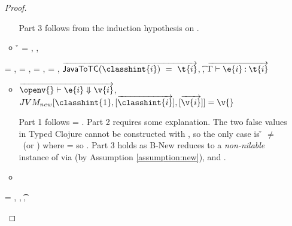 \begin{lemma}
\begin{enumerate}
\begin{proof}
\begin{case}[T-Do]
\begin{itemize}
\begin{subcase}[B-Do]
Part 3 follows from the induction hypothesis on .
    \end{subcase}
  \item[]
\begin{subcase}[BE-Do]
  \v{} = {},
\opsem {\openv{}} {} {},



\end{subcase}
\end{itemize}
\end{case}

\begin{case}[T-NewStatic]
  \e{} = { {\classhint{}} 
                                                          {\class{}} {}},
  \object{} = \emptyobject{},
\thenprop{\prop{}} = \topprop{},
\elseprop{\prop{}} = \botprop{},
   $\overrightarrow{
\javatotc {\classhint{i}}
          {\t{i}}
          }$,
  \javatotc {\classhint{}}
            {\t{}},
            $
  \overrightarrow{
  \judgementtwo {\propenv{}}
                    {\hastype {\e{i}} {\t{i}}}
                  }$

\begin{itemize}
  \item[]
\begin{subcase}[B-New]
  $
  \overrightarrow{
  \opsem {\openv{}}
         {\e{i}}
         {\v{i}}
       }$,
         $\newjava {\classhint{1}}
                  {\overrightarrow{\classhint{i}}}
                  {\overrightarrow{\v{i}}}
                  {\v{}}$

Part 1 follows \object{} = \emptyobject{}.
Part 2 requires some explanation. The two false values in Typed Clojure
cannot be constructed with \newliteral, so the only case is \v{} $\not=$ \false\ (or \nil)
where \thenprop{\prop{}} = \topprop{} so \satisfies{\openv{}}{\thenprop{\prop{}}}.
Part 3 holds as B-New reduces to a \emph{non-nilable}
instance of \class{} via \newjavaliteral (by Assumption \ref{assumption:new}), and \javatotc{\classhint{}}{\t{}}.
\end{subcase}
  \item[]
\begin{subcase}[BE-New]
\end{subcase}
\end{itemize}
\end{case}

\begin{case}[T-FieldStatic]
  \e{} = { {} {\fld{}} {}},
   {\class{}},
   {\t{}},
  \judgementtwo {\propenv{}} { {\class{}}}


\end{case}
\end{proof}
\end{enumerate}
\end{lemma}
